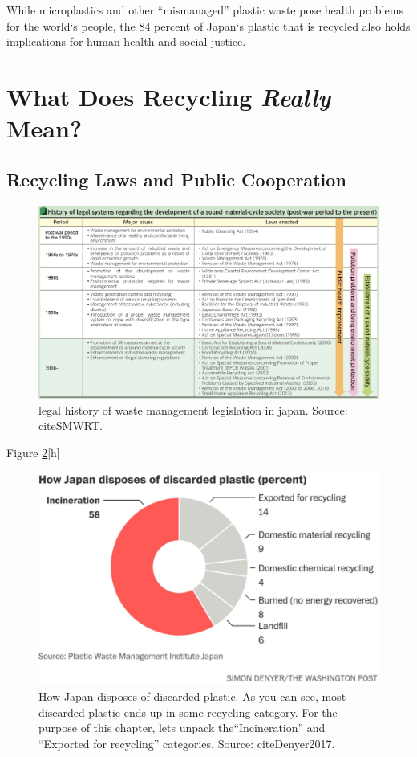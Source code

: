 \documentclass{book}\usepackage{knitr}
\begin{document}
While microplastics and other ``mismanaged'' plastic waste pose health problems for the world`s people, the 84 percent of Japan`s plastic that is recycled also holds implications for human health and social justice.   
 
\section{What Does Recycling \emph{Really} Mean?}

\subsection{Recycling Laws and Public Cooperation}


\begin{figure}[h]
\includegraphics[width=\linewidth]{images/JapanPlastics/legalhis.png}
\caption{legal history of waste management legislation in japan. Source: citeSMWRT.}
\label{fig:legalhis}
\end{figure}

Figure \ref{fig:rcycle}[h]

\begin{figure}
\includegraphics[width=\linewidth]{images/JapanPlastics/Rcycle.png}
\caption{How Japan disposes of discarded plastic. As you can see, most discarded plastic ends up in some recycling category. For the purpose of this chapter, lets unpack the``Incineration'' and ``Exported for recycling'' categories. Source: citeDenyer2017.}
\label{fig:rcycle}
\end{figure}
\end{document}
